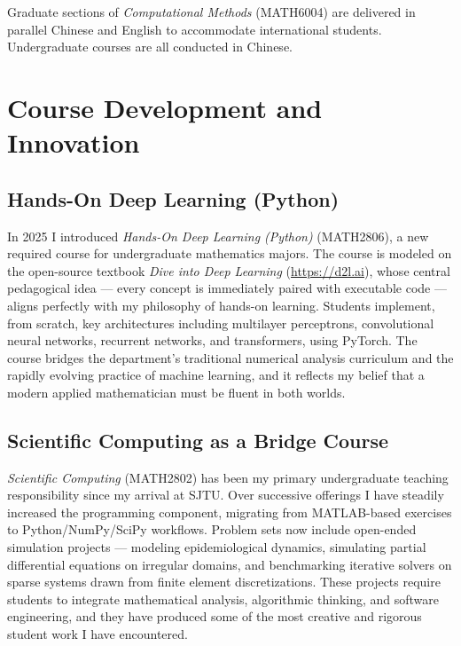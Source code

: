 \documentclass[12pt, a4paper]{article}
\begin{document}
Graduate sections of \emph{Computational Methods} (MATH6004) are delivered in
parallel Chinese and English to accommodate international students.
Undergraduate courses are all conducted in Chinese.

\section{Course Development and Innovation}

\subsection{Hands-On Deep Learning (Python)}

In 2025 I introduced \emph{Hands-On Deep Learning (Python)} (MATH2806), a
new required course for undergraduate mathematics majors.
The course is modeled on the open-source textbook \emph{Dive into Deep Learning}
(\url{https://d2l.ai}), whose central pedagogical idea --- every concept is
immediately paired with executable code --- aligns perfectly with my
philosophy of hands-on learning.
Students implement, from scratch, key architectures including multilayer
perceptrons, convolutional neural networks, recurrent networks, and
transformers, using PyTorch.
The course bridges the department's traditional numerical analysis curriculum
and the rapidly evolving practice of machine learning, and it reflects my
belief that a modern applied mathematician must be fluent in both worlds.

\subsection{Scientific Computing as a Bridge Course}

\emph{Scientific Computing} (MATH2802) has been my primary undergraduate
teaching responsibility since my arrival at SJTU.
Over successive offerings I have steadily increased the programming component,
migrating from MATLAB-based exercises to Python/NumPy/SciPy workflows.
Problem sets now include open-ended simulation projects --- modeling
epidemiological dynamics, simulating partial differential equations on irregular
domains, and benchmarking iterative solvers on sparse systems drawn from
finite element discretizations.
These projects require students to integrate mathematical analysis, algorithmic
thinking, and software engineering, and they have produced some of the most
creative and rigorous student work I have encountered.
\end{document}
